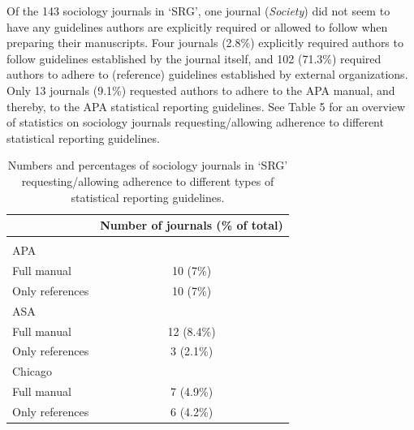 \documentclass[
  12pt,
]{article}
\begin{document}
Of the 143 sociology journals in `SRG', one journal (\emph{Society}) did
not seem to have any guidelines authors are explicitly required or
allowed to follow when preparing their manuscripts. Four journals
(2.8\%) explicitly required authors to follow guidelines established by
the journal itself, and 102 (71.3\%) required authors to adhere to
(reference) guidelines established by external organizations. Only 13
journals (9.1\%) requested authors to adhere to the APA manual, and
thereby, to the APA statistical reporting guidelines. See Table 5 for an
overview of statistics on sociology journals requesting/allowing
adherence to different statistical reporting guidelines. \pagebreak

\begin{table}[H]

\caption{\label{tab:Table 5 statistical reporting guidelines}Numbers and percentages of sociology journals in ‘SRG' requesting/allowing adherence to different types of statistical reporting guidelines.}
\centering
\fontsize{10}{12}\selectfont
\begin{threeparttable}
\begin{tabular}[t]{lc}
\toprule
  & Number of journals (\% of total)\\
\midrule
\addlinespace[0.3em]
\multicolumn{2}{l}{\textbf{Required}}\\
\hspace{1em}APA & \\
\hspace{1em}\hspace{1em}Full manual & 10 (7\%)\\
\hspace{1em}\hspace{1em}Only references & 10 (7\%)\\
\hspace{1em}ASA & \\
\hspace{1em}\hspace{1em}Full manual & 12 (8.4\%)\\
\hspace{1em}\hspace{1em}Only references & 3 (2.1\%)\\
\hspace{1em}Chicago & \\
\hspace{1em}\hspace{1em}Full manual & 7 (4.9\%)\\
\hspace{1em}\hspace{1em}Only references & 6 (4.2\%)\\

\end{tabular}
\end{threeparttable}
\end{table}
\end{document}
